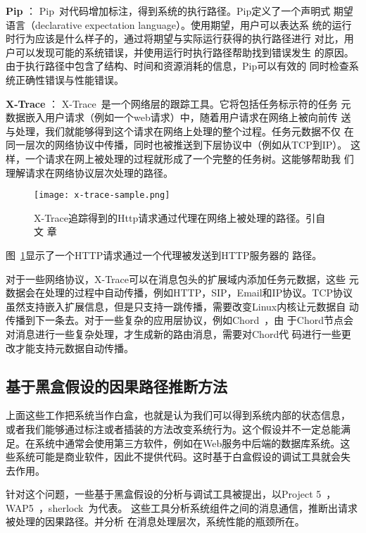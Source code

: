 \textbf{Pip} ：
Pip~\cite{pip}对代码增加标注，得到系统的执行路径。Pip定义了一个声明式
期望语言（declarative expectation language）。使用期望，用户可以表达系
统的运行时行为应该是什么样子的，通过将期望与实际运行获得的执行路径进行
对比，用户可以发现可能的系统错误，并使用运行时执行路径帮助找到错误发生
的原因。由于执行路径中包含了结构、时间和资源消耗的信息，Pip可以有效的
同时检查系统正确性错误与性能错误。


\textbf{X-Trace} ：
X-Trace~\cite{x-trace}是一个网络层的跟踪工具。它将包括任务标示符的任务
元数据嵌入用户请求（例如一个web请求）中，随着用户请求在网络上被向前传
送与处理，我们就能够得到这个请求在网络上处理的整个过程。任务元数据不仅
在同一层次的网络协议中传播，同时也被推送到下层协议中（例如从TCP到IP）。
这样，一个请求在网上被处理的过程就形成了一个完整的任务树。这能够帮助我
们理解请求在网络协议层次处理的路径。

\begin{figure}
\centering
\begin{minipage}{0.8\linewidth}
\texttt{[image: x-trace-sample.png]}
\caption{X-Trace追踪得到的Http请求通过代理在网络上被处理的路径。引自文
章~\cite{x-trace}}
\label{fig:x-trace}
\end{minipage}
\end{figure}

图~\ref{fig:x-trace}显示了一个HTTP请求通过一个代理被发送到HTTP服务器的
路径。

对于一些网络协议，X-Trace可以在消息包头的扩展域内添加任务元数据，这些
元数据会在处理的过程中自动传播，例如HTTP，SIP，Email和IP协议。TCP协议
虽然支持嵌入扩展信息，但是只支持一跳传播，需要改变Linux内核让元数据自
动传播到下一条去。对于一些复杂的应用层协议，例如Chord~\cite{chord}，由
于Chord节点会对消息进行一些复杂处理，才生成新的路由消息，需要对Chord代
码进行一些更改才能支持元数据自动传播。

\subsection{基于黑盒假设的因果路径推断方法}
\label{related:debug:inference}

上面这些工作把系统当作白盒，也就是认为我们可以得到系统内部的状态信息，
或者我们能够通过标注或者插装的方法改变系统行为。这个假设并不一定总能满
足。在系统中通常会使用第三方软件，例如在Web服务中后端的数据库系统。这
些系统可能是商业软件，因此不提供代码。这时基于白盒假设的调试工具就会失
去作用。

针对这个问题，一些基于黑盒假设的分析与调试工具被提出，以Project
5~\cite{project5}，WAP5~\cite{wap5}，sherlock~\cite{sherlock}为代表。
这些工具分析系统组件之间的消息通信，推断出请求被处理的因果路径。并分析
在消息处理层次，系统性能的瓶颈所在。

